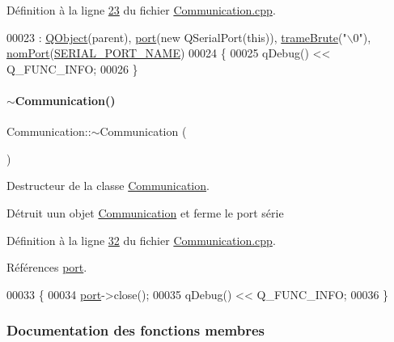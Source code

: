 Définition à la ligne \hyperlink{_communication_8cpp_source_l00023}{23} du fichier \hyperlink{_communication_8cpp_source}{Communication.\+cpp}.


\begin{DoxyCode}
00023                                             : \hyperlink{class_q_object}{QObject}(parent), \hyperlink{class_communication_aff7d55208f31232fbdc1dcec488908f1}{port}(\textcolor{keyword}{new} QSerialPort(\textcolor{keyword}{this})), 
      \hyperlink{class_communication_a7a55775be5e16249315fe5faef4f13b4}{trameBrute}(\textcolor{stringliteral}{"\(\backslash\)0"}), \hyperlink{class_communication_a5fa89ee1fc732871f3f8f177fb50bf2a}{nomPort}(\hyperlink{_communication_8h_a8542e30f71d5d41f405c329f0e9bafd7}{SERIAL\_PORT\_NAME})
00024 \{
00025     qDebug() << Q\_FUNC\_INFO;
00026 \}
\end{DoxyCode}
\mbox{\label{class_communication_a75ba08ce908d45251e28e4c1db94e6f4}} 
\paragraph{\texorpdfstring{$\sim$\+Communication()}{~Communication()}}
{\footnotesize\ttfamily Communication\+::$\sim$\+Communication (\begin{DoxyParamCaption}{ }\end{DoxyParamCaption})}



Destructeur de la classe \hyperlink{class_communication}{Communication}. 

Détruit uun objet \hyperlink{class_communication}{Communication} et ferme le port série 

Définition à la ligne \hyperlink{_communication_8cpp_source_l00032}{32} du fichier \hyperlink{_communication_8cpp_source}{Communication.\+cpp}.



Références \hyperlink{_communication_8h_source_l00067}{port}.


\begin{DoxyCode}
00033 \{
00034     \hyperlink{class_communication_aff7d55208f31232fbdc1dcec488908f1}{port}->close();
00035     qDebug() << Q\_FUNC\_INFO;
00036 \}
\end{DoxyCode}


\subsubsection{Documentation des fonctions membres}
\mbox{\label{class_communication_aa447a2fe9e2e5c2467a0816865a77340}} 
